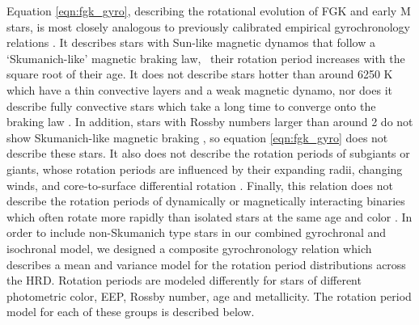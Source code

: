 Equation \ref{eqn:fgk_gyro}, describing the rotational evolution of FGK and
early M stars, is most closely analogous to previously calibrated empirical
gyrochronology relations \citep[\eg][]{barnes2003, barnes2007, mamajek2008,
barnes2010, angus2015}.
It describes stars with Sun-like magnetic dynamos that follow a
`Skumanich-like' magnetic braking law, \ie\ their rotation period increases
with the square root of their age.
It does not describe stars hotter than around 6250 K which have a thin
convective layers and a weak magnetic dynamo, nor does it describe fully
convective stars which take a long time to converge onto the
\citet{skumanich1972} braking law \citep{krishnamurthi1997}.
In addition, stars with Rossby numbers larger than around 2 do not show
Skumanich-like magnetic braking \citep{vansaders2016, vansaders2018}, so
equation \ref{eqn:fgk_gyro} does not describe these stars.
It also does not describe the rotation periods of subgiants or giants, whose
rotation periods are influenced by their expanding radii, changing winds, and
core-to-surface differential rotation \citep[\eg][]{vansaders2013, tayar2018}.
Finally, this relation does not describe the rotation periods of dynamically
or magnetically interacting binaries which often rotate more rapidly than
isolated stars at the same age and color \citep{douglas2016}.
In order to include non-Skumanich type stars in our combined gyrochronal and
isochronal model, we designed a composite gyrochronology relation which
describes a mean and variance model for the rotation period distributions
across the HRD.
Rotation periods are modeled differently for stars of different photometric
color, EEP, Rossby number, age and metallicity.
The rotation period model for each of these groups is described below.
